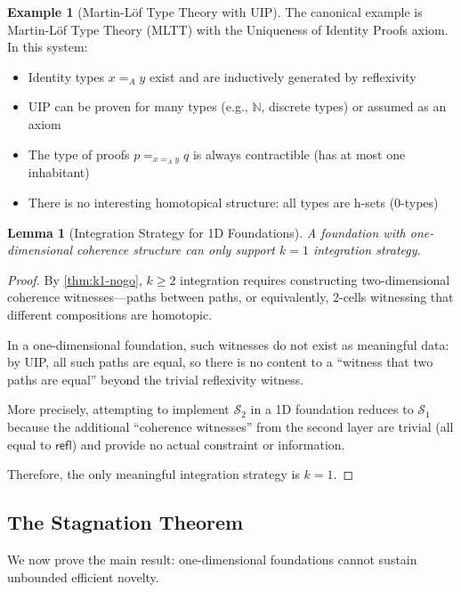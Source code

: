 \documentclass[11pt]{article}
\newtheorem{lemma}[theorem]{Lemma}
\theoremstyle{definition}
\newtheorem{example}[theorem]{Example}
\theoremstyle{remark}
\begin{document}
\begin{example}[Martin-Löf Type Theory with UIP]
\label{ex:mltt-uip}
The canonical example is Martin-Löf Type Theory (MLTT) with the Uniqueness of Identity Proofs axiom. In this system:
\begin{itemize}
\item Identity types $x =_A y$ exist and are inductively generated by reflexivity
\item UIP can be proven for many types (e.g., $\mathbb{N}$, discrete types) or assumed as an axiom
\item The type of proofs $p =_{x =_A y} q$ is always contractible (has at most one inhabitant)
\item There is no interesting homotopical structure: all types are h-sets (0-types)
\end{itemize}
\end{example}

\begin{lemma}[Integration Strategy for 1D Foundations]
\label{lem:1d-implies-k1}
A foundation with one-dimensional coherence structure can only support $k = 1$ integration strategy.
\end{lemma}

\begin{proof}
By \cref{thm:k1-nogo}, $k \geq 2$ integration requires constructing two-dimensional coherence witnesses---paths between paths, or equivalently, 2-cells witnessing that different compositions are homotopic.

In a one-dimensional foundation, such witnesses do not exist as meaningful data: by UIP, all such paths are equal, so there is no content to a ``witness that two paths are equal'' beyond the trivial reflexivity witness.

More precisely, attempting to implement $\mathcal{S}_2$ in a 1D foundation reduces to $\mathcal{S}_1$ because the additional ``coherence witnesses'' from the second layer are trivial (all equal to $\mathsf{refl}$) and provide no actual constraint or information.

Therefore, the only meaningful integration strategy is $k = 1$.
\end{proof}

\subsection{The Stagnation Theorem}

We now prove the main result: one-dimensional foundations cannot sustain unbounded efficient novelty.
\end{document}
